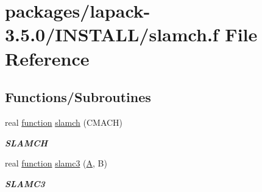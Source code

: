 \hypertarget{slamch_8f}{}\section{packages/lapack-\/3.5.0/\+I\+N\+S\+T\+A\+L\+L/slamch.f File Reference}
\label{slamch_8f}
\subsection*{Functions/\+Subroutines}
\begin{DoxyCompactItemize}
\item 
real \hyperlink{afunc_8m_a7b5e596df91eadea6c537c0825e894a7}{function} \hyperlink{group__auxOTHERauxiliary_ga279f9f1e475af3a6e6101fbfd874f955}{slamch} (C\+M\+A\+C\+H)
\begin{DoxyCompactList}\small\item\em {\bfseries S\+L\+A\+M\+C\+H} \end{DoxyCompactList}\item 
real \hyperlink{afunc_8m_a7b5e596df91eadea6c537c0825e894a7}{function} \hyperlink{group__auxOTHERauxiliary_ga063f886475dbe005f58b9c37ced98b65}{slamc3} (\hyperlink{classA}{A}, B)
\begin{DoxyCompactList}\small\item\em {\bfseries S\+L\+A\+M\+C3} \end{DoxyCompactList}\end{DoxyCompactItemize}
